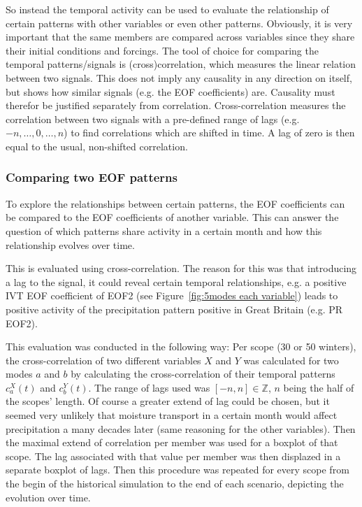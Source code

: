 So instead the temporal activity can be used to evaluate the relationship of certain patterns with other variables or even other patterns. 
Obviously, it is very important that the same members are compared across variables since they share their initial conditions and forcings.  
The tool of choice for comparing the temporal patterns/signals is (cross)correlation, which measures the linear relation between two signals. 
This does not imply any causality in any direction on itself, but shows how similar signals (e.g. the EOF coefficients) are. 
Causality must therefor be justified separately from correlation.  
Cross-correlation measures the correlation between two signals with a pre-defined range of lags (e.g. $-n,\dots,0,\dots,n$) to find correlations which are shifted in time. 
A lag of zero is then equal to the usual, non-shifted correlation. 

\subsubsection{Comparing two EOF patterns}

To explore the relationships between certain patterns, the EOF coefficients can be compared to the EOF coefficients of another variable. 
This can answer the question of which patterns share activity in a certain month and how this relationship evolves over time. 

This is evaluated using cross-correlation. 
The reason for this was that introducing a lag to the signal, it could reveal certain temporal relationships, e.g. a positive IVT EOF coefficient of EOF2 (see Figure~\ref{fig:5modes each variable}) leads to positive activity of the precipitation pattern positive in Great Britain (e.g. PR EOF2). 

This evaluation was conducted in the following way: 
Per scope (30 or 50 winters), the cross-correlation of two different variables $X$ and $Y$ was calculated for two modes $a$ and $b$ by calculating the cross-correlation of their temporal patterns $c_a^X(t)$ and $c_b^Y(t)$. 
The range of lags used was $[-n,n] \in \mathbb{Z}$, $n$ being the half of the scopes' length. 
Of course a greater extend of lag could be chosen, but it seemed very unlikely that moisture transport in a certain month would affect precipitation a many decades later (same reasoning for the other variables).
Then the maximal extend of correlation per member was used for a boxplot of that scope.
The lag associated with that value per member was then displazed in a separate boxplot of lags. 
Then this procedure was repeated for every scope from the begin of the historical simulation to the end of each scenario, depicting the evolution over time. 

